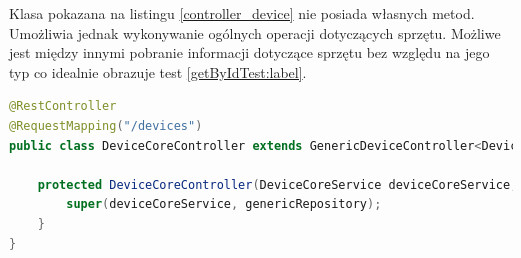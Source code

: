 Klasa pokazana na listingu \ref{controller_device} nie posiada własnych metod. Umożliwia jednak wykonywanie ogólnych operacji dotyczących sprzętu. Możliwe jest między innymi pobranie informacji dotyczące sprzętu bez względu na jego typ co idealnie obrazuje test \ref{getByIdTest:label}.
\begin{lstlisting}[language=Java, style=JavaStyle,  caption={Klasa potomna reprezentująca ogólną postać sprzętu}, label={controller_device}]
@RestController
@RequestMapping("/devices")
public class DeviceCoreController extends GenericDeviceController<DeviceCore>{

    protected DeviceCoreController(DeviceCoreService deviceCoreService, GenericDeviceRepository<DeviceCore> genericRepository) {
        super(deviceCoreService, genericRepository);
    }
}
\end{lstlisting}



